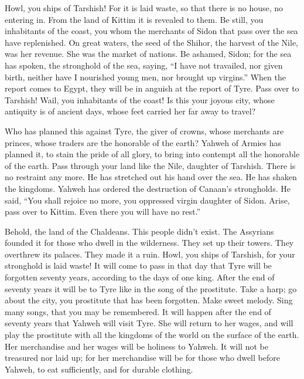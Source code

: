 Howl, you ships of Tarshish! For it is laid waste, so that there is no
house, no entering in. From the land of Kittim it is revealed to them.
 Be still, you inhabitants of the coast, you whom the
merchants of Sidon that pass over the sea have replenished.
 On great waters, the seed of the Shihor, the harvest of
the Nile, was her revenue. She was the market of nations. 
Be ashamed, Sidon; for the sea has spoken, the stronghold of the sea,
saying, ``I have not travailed, nor given birth, neither have I
nourished young men, nor brought up virgins.''  When the
report comes to Egypt, they will be in anguish at the report of Tyre.
 Pass over to Tarshish! Wail, you inhabitants of the
coast!  Is this your joyous city, whose antiquity is of
ancient days, whose feet carried her far away to travel?

 Who has planned this against Tyre, the giver of crowns,
whose merchants are princes, whose traders are the honorable of the
earth?  Yahweh of Armies has planned it, to stain the
pride of all glory, to bring into contempt all the honorable of the
earth.  Pass through your land like the Nile, daughter of
Tarshish. There is no restraint any more.  He has
stretched out his hand over the sea. He has shaken the kingdoms. Yahweh
has ordered the destruction of Canaan's strongholds.  He
said, ``You shall rejoice no more, you oppressed virgin daughter of
Sidon. Arise, pass over to Kittim. Even there you will have no rest.''

 Behold, the land of the Chaldeans. This people didn't
exist. The Assyrians founded it for those who dwell in the wilderness.
They set up their towers. They overthrew its palaces. They made it a
ruin.  Howl, you ships of Tarshish, for your stronghold
is laid waste!  It will come to pass in that day that
Tyre will be forgotten seventy years, according to the days of one king.
After the end of seventy years it will be to Tyre like in the song of
the prostitute.  Take a harp; go about the city, you
prostitute that has been forgotten. Make sweet melody. Sing many songs,
that you may be remembered.  It will happen after the end
of seventy years that Yahweh will visit Tyre. She will return to her
wages, and will play the prostitute with all the kingdoms of the world
on the surface of the earth.  Her merchandise and her
wages will be holiness to Yahweh. It will not be treasured nor laid up;
for her merchandise will be for those who dwell before Yahweh, to eat
sufficiently, and for durable clothing.

